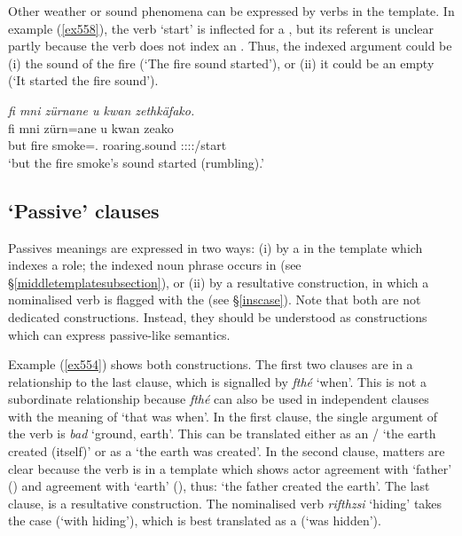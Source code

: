 Other weather or sound phenomena can be expressed by verbs in the  template. In example (\ref{ex558}), the verb `start' is inflected for a \Stsg{} , but its referent is unclear \textendash{} partly because the verb does not index an . Thus, the indexed argument could be (i) the sound of the fire (`The fire sound started'), or (ii) it could be an empty  (`It started the fire sound').

\begin{exe}
	\ex \emph{fi mni zürnane u kwan zethkäfako.}\\
	\gll fi mni zürn=ane {u kwan} zeako\\
	but fire smoke=\Poss.\Sg{} {roaring.sound} \Sg:\Sbj:\Pst:\Pfv:\Andat/start\\
	\trans `but the fire smoke's sound started (rumbling).'
	\label{ex558}
\end{exe}

\subsection{`Passive' clauses}\label{passiveclause}

Passives meanings are expressed in two ways: (i) by a  in the  template which indexes a  role; the indexed noun phrase occurs in   (see \S{}\ref{middletemplatesubsection}), or (ii) by a resultative construction, in which a nominalised verb is flagged with the   (see \S{}\ref{inscase}). Note that both are not dedicated  constructions. Instead, they should be understood as constructions which can express passive-like semantics.%

Example (\ref{ex554}) shows both constructions. The first two clauses are in a  relationship to the last clause, which is signalled by \emph{fthé} `when'. This is not a subordinate relationship because \emph{fthé} can also be used in independent clauses with the meaning of `that was when'. In the first clause, the single argument of the verb is \emph{bad} `ground, earth'. This can be translated either as an / `the earth created (itself)' or as a  `the earth was created'. In the second clause, matters are clear because the verb is in a  template which shows actor agreement with `father' (\Erg) and  agreement with `earth' (\Abs), thus: `the father created the earth'. The last clause, is a resultative construction. The nominalised verb \emph{rifthzsi} `hiding' takes the  case (`with hiding'), which is best translated as a  (`was hidden').

